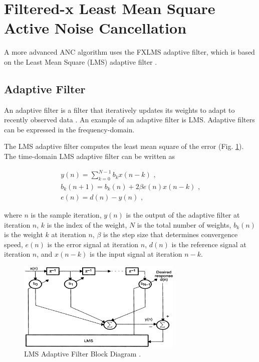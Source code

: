 \documentclass[11pt, letterpaper]{article}
\numberwithin{equation}{section}
\begin{document}
\section{Filtered-x Least Mean Square Active Noise Cancellation}
\label{sec:ANC_FXLMS}

A more advanced ANC algorithm uses the FXLMS adaptive filter, which is based on the Least Mean Square (LMS) adaptive filter \cite{kajikawa}.

\subsection{Adaptive Filter}

An adaptive filter is a filter that iteratively updates its weights to adapt to recently observed data \cite{feintuch}. An example of an adaptive filter is LMS. Adaptive filters can be expressed in the frequency-domain.

The LMS adaptive filter computes the least mean square of the error (Fig. \ref{fig:LMS_fltr}). The time-domain LMS adaptive filter can be written as

\begin{gather}
    y(n) = \sum \limits_{k = 0}^{N - 1} b_k x(n - k) \text{ ,}\\
    b_k(n + 1) = b_k(n) + 2 \beta e(n) x(n - k) \text{ ,}\\
    e(n) = d(n) - y(n) \text{ ,}
\end{gather}

where $n$ is the sample iteration, $y(n)$ is the output of the adaptive filter at iteration $n$, $k$ is the index of the weight, $N$ is the total number of weights, $b_k(n)$ is the weight $k$ at iteration $n$, $\beta$ is the step size that determines convergence speed, $e(n)$ is the error signal at iteration $n$, $d(n)$ is the reference signal at iteration $n$, and $x(n - k)$ is the input signal at iteration $n - k$.

\begin{figure}[H]
	\begin{center}
		\includegraphics[height=0.35\textheight, width=0.7\textwidth]{images/roy_LMS_fltr.png}
		\caption{LMS Adaptive Filter Block Diagram \cite{roy}.}
		\label{fig:LMS_fltr}
	\end{center}
\end{figure}
\end{document}
